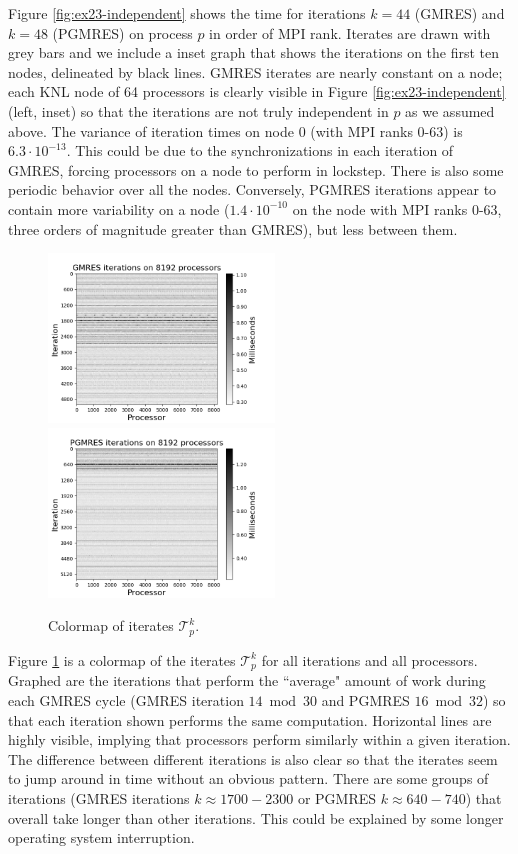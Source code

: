 \documentclass[sigconf]{acmart}
\begin{document}
Figure \ref{fig:ex23-independent} shows the time for iterations $k=44$ (GMRES) and $k=48$ (PGMRES) on process $p$ in order of MPI rank. Iterates are drawn with grey bars and we include a inset graph that shows the iterations on the first ten nodes, delineated by black lines. 
GMRES iterates are nearly constant on a node; each KNL node of 64 processors is clearly visible in Figure \ref{fig:ex23-independent} (left, inset) so that the iterations are not truly independent in $p$ as we assumed above. The variance of iteration times on node 0 (with MPI ranks 0-63) is $6.3\cdot10^{-13}$. 
This could be due to the synchronizations in each iteration of GMRES, forcing processors on a node to perform in lockstep. 
There is also some periodic behavior over all the nodes.
Conversely, PGMRES iterations appear to contain more variability on a node ($1.4\cdot10^{-10}$ on the node with MPI ranks 0-63, three orders of magnitude greater than GMRES), but less between them. 

\begin{figure}[b]
\centering
\includegraphics[width=6cm]{../plots/GMRES_ex23_8192_1000000__stationary_in_t_colormap.png}
\includegraphics[width=6cm]{../plots/PGMRES_ex23_8192_1000000__stationary_in_t_colormap.png}
\caption{Colormap of iterates $\mathcal{T}_p^k$.} \label{fig:ex23-stationary}
\end{figure}




Figure \ref{fig:ex23-stationary} is a colormap of the iterates $\mathcal{T}_p^k$ for all iterations and all processors.
Graphed are the iterations that perform the ``average" amount of work during each GMRES cycle (GMRES iteration $14 \bmod 30$ and PGMRES $16 \bmod 32$) so that each iteration shown performs the same computation. 
Horizontal lines are highly visible, implying that processors perform similarly within a given iteration. 
The difference between different iterations is also clear so that the iterates seem to jump around in time without an obvious pattern.
There are some groups of iterations (GMRES iterations $k \approx 1700 - 2300$ or PGMRES $k \approx 640 - 740$) that overall take longer than other iterations. This could be explained by some longer operating system interruption.
\end{document}
